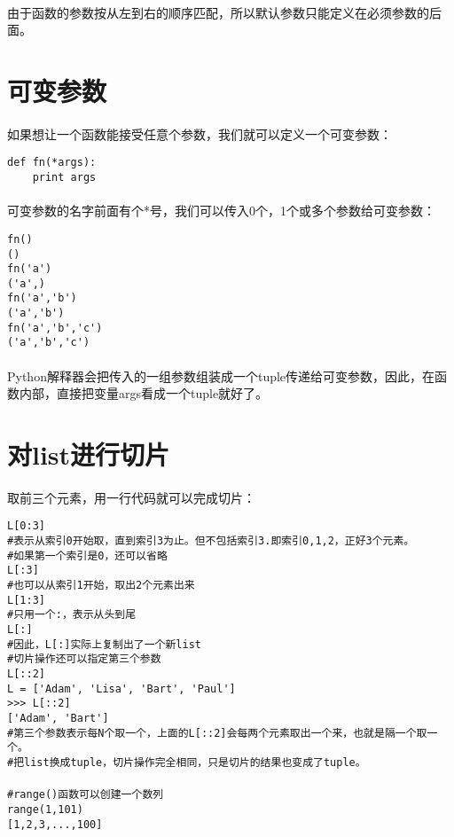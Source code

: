 \documentclass{article}
\begin{document}
\begin{CJK}{UTF8}{gbsn}
\paragraph{}
由于函数的参数按从左到右的顺序匹配，所以默认参数只能定义在必须参数的后面。
\section{可变参数}
\paragraph{}
如果想让一个函数能接受任意个参数，我们就可以定义一个可变参数：
\begin{verbatim}
def fn(*args):
    print args
\end{verbatim}
\paragraph{}
可变参数的名字前面有个*号，我们可以传入0个，1个或多个参数给可变参数：
\begin{verbatim}
fn()
()
fn('a')
('a',)
fn('a','b')
('a','b')
fn('a','b','c')
('a','b','c')
\end{verbatim}
\paragraph{}
Python解释器会把传入的一组参数组装成一个tuple传递给可变参数，因此，在函数内部，直接把变量args看成一个tuple就好了。
\section{对list进行切片}
\paragraph{}
取前三个元素，用一行代码就可以完成切片：
\begin{verbatim}
L[0:3]
#表示从索引0开始取，直到索引3为止。但不包括索引3.即索引0,1,2，正好3个元素。
#如果第一个索引是0，还可以省略
L[:3]
#也可以从索引1开始，取出2个元素出来
L[1:3]
#只用一个:，表示从头到尾
L[:]
#因此，L[:]实际上复制出了一个新list
#切片操作还可以指定第三个参数
L[::2]
L = ['Adam', 'Lisa', 'Bart', 'Paul']
>>> L[::2]
['Adam', 'Bart']
#第三个参数表示每N个取一个，上面的L[::2]会每两个元素取出一个来，也就是隔一个取一个。
#把list换成tuple，切片操作完全相同，只是切片的结果也变成了tuple。
\end{verbatim}
\paragraph{}
\begin{verbatim}
#range()函数可以创建一个数列
range(1,101)
[1,2,3,...,100]
\end{verbatim}

\end{CJK}
\end{document}
